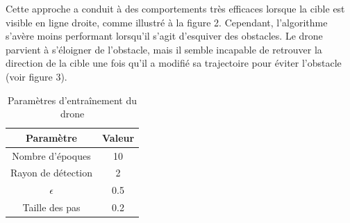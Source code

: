 \documentclass[a4paper, 12pt]{article}
\begin{document}
Cette approche a conduit à des comportements très efficaces lorsque la cible est visible en ligne droite, comme illustré à la figure 2. Cependant, l'algorithme s'avère moins performant lorsqu'il s'agit d'esquiver des obstacles. Le drone parvient à s'éloigner de l'obstacle, mais il semble incapable de retrouver la direction de la cible une fois qu'il a modifié sa trajectoire pour éviter l'obstacle (voir figure 3).
\begin{table}[H]
    \centering
    \begin{tabular}{|c|c|}
        \hline
        \textbf{Paramètre} & \textbf{Valeur} \\
        \hline
        Nombre d'époques & 10 \\
        Rayon de détection & 2 \\
        $\epsilon$ & 0.5 \\
        Taille des pas & 0.2 \\
        \hline
    \end{tabular}
    \caption{Paramètres d'entraînement du drone}
    \label{tab:training-parameters}
\end{table}
\end{document}
